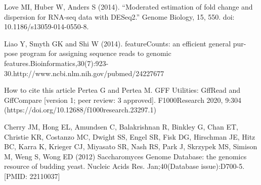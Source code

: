\documentclass{article}
\begin{document}
\begin{thebibliography}{9}
Love MI, Huber W, Anders S (2014). “Moderated estimation of fold change and dispersion for RNA-seq data with DESeq2.” Genome Biology, 15, 550. doi: 10.1186/s13059-014-0550-8. 


Liao Y, Smyth GK and Shi W (2014).  featureCounts:  an efficient general pur-pose program for assigning sequence reads to genomic features.Bioinformatics,30(7):923-30.http://www.ncbi.nlm.nih.gov/pubmed/24227677

How to cite this article
Pertea G and Pertea M. GFF Utilities: GffRead and GffCompare [version 1; peer review: 3 approved]. F1000Research 2020, 9:304 (https://doi.org/10.12688/f1000research.23297.1) 

Cherry JM, Hong EL, Amundsen C, Balakrishnan R, Binkley G, Chan ET, Christie KR, Costanzo MC, Dwight SS, Engel SR, Fisk DG, Hirschman JE, Hitz BC, Karra K, Krieger CJ, Miyasato SR, Nash RS, Park J, Skrzypek MS, Simison M, Weng S, Wong ED (2012) Saccharomyces Genome Database: the genomics resource of budding yeast. Nucleic Acids Res. Jan;40(Database issue):D700-5. [PMID: 22110037]

 


\end{thebibliography}


\end{document}
